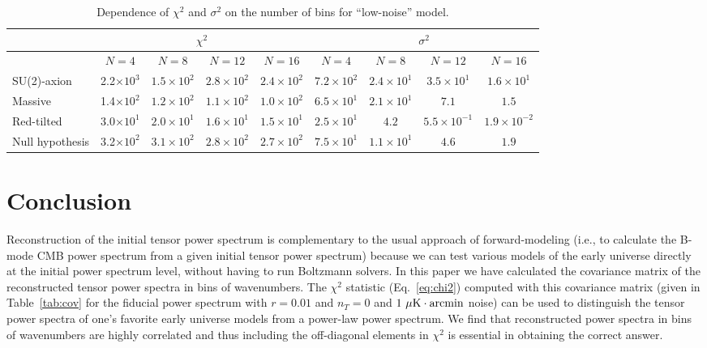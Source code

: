 \documentclass[tightenlines,floats,aps,nofootinbib,prd,onecolumn,preprintnumbers]{revtex4}
\begin{document}
\begin{table}[!ht]
\begin{tabular}{|l|cccc||cccc|}
\hline
&\multicolumn{4}{c||}{$\chi^2$} &\multicolumn{4}{c|}{$\sigma^2$} \\\hline
& $N=4$ & $N=8$ & $N=12$ & $N=16$ & $N=4$ & $N=8$ & $N=12$ & $N=16$ \\ \hline
SU(2)-axion & 2.2$\times 10^{3}$ & $1.5\times 10^{2}$ & $2.8\times 10^{2}$ & $2.4\times 10^{2}$ & $7.2\times 10^{2}$ & $2.4\times 10^{1}$ & $3.5\times 10^{1}$ & $1.6\times 10^{1}$ \\
Massive     & 1.4$\times 10^{2}$ & $1.2\times 10^{2}$ & $1.1\times 10^{2}$ & $1.0\times 10^{2}$ & $6.5\times 10^{1}$ & $2.1\times 10^{1}$ & $7.1$ & $1.5$\\
Red-tilted  & 3.0$\times 10^{1}$ & $2.0\times 10^{1}$ & $1.6\times 10^{1}$ & $1.5\times 10^{1}$ & $2.5\times 10^{1}$ & $4.2             $ & $5.5\times 10^{-1}$ & $1.9\times 10^{-2}$ \\
Null hypothesis & 3.2$\times 10^{2}$ & $3.1\times 10^{2}$ & $2.8\times 10^{2}$ & $2.7\times 10^{2}$ & $7.5\times 10^{1}$ & $1.1\times 10^{1}$ & $4.6$ & $1.9$ \\\hline
\end{tabular} 
 \caption{Dependence of $\chi^2$ and $\sigma^2$ on the number of
 bins for ``low-noise'' model.}
 \label{tab:chi2_sig2}
\end{table}

\section{Conclusion}
\label{sec:conclusion}
Reconstruction of the initial tensor power spectrum is complementary to
the usual approach of forward-modeling (i.e., to calculate the B-mode CMB power spectrum from
a given initial tensor power spectrum) because we can test various
models of the early universe directly at the initial power spectrum level,
without having to run Boltzmann solvers. In this paper we have
calculated the covariance matrix of the reconstructed tensor power
spectra in bins of wavenumbers. The $\chi^2$ statistic (Eq.~\ref{eq:chi2}) computed with this covariance matrix (given in Table~\ref{tab:cov} for
the fiducial power spectrum with $r=0.01$ and $n_T=0$ and $1~\mu{\rm
K}\cdot{\rm arcmin}$ noise) can be used to distinguish the tensor power
spectra of one's favorite early universe models from a power-law
power spectrum. We find that reconstructed power spectra in bins of
wavenumbers are highly correlated and thus including the off-diagonal
elements in $\chi^2$ is essential in obtaining the correct answer.
\end{document}
